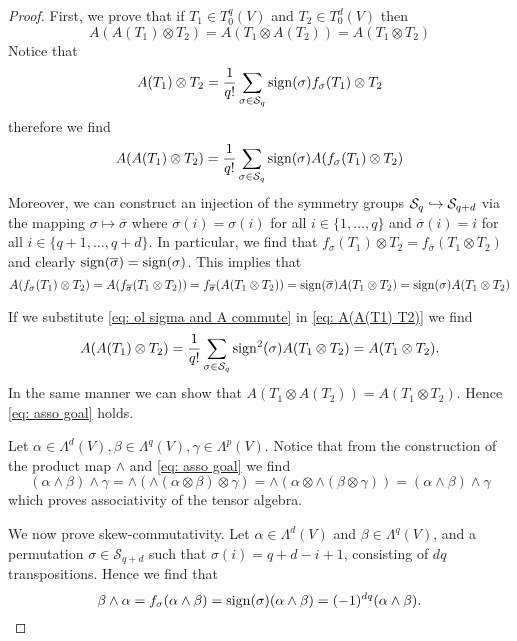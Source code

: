 \begin{proof}
  First, we prove that if \(T_1 \in T_0^q(V)\) and \(T_2 \in T_0^d(V)\) then
  \begin{equation}\label{eq: asso goal}
    A(A(T_1) \otimes T_2) = A(T_1 \otimes A(T_2)) =
    A(T_1 \otimes T_2)
  \end{equation} Notice that \[
    A(T_1) \otimes T_2 = \frac 1 {q!} \sum_{\sigma \in \mathcal S_q}
    \operatorname{sign}(\sigma) f_\sigma(T_1) \otimes T_2
  \] 
  therefore we find
  \begin{equation}\label{eq: A(A(T1) T2)}
    A(A(T_1) \otimes T_2) = \frac 1 {q!} \sum_{\sigma \in \mathcal S_q}
    \operatorname{sign}(\sigma) A(f_\sigma(T_1) \otimes T_2)
  \end{equation}
  Moreover, we can construct an injection of the symmetry groups \(\mathcal S_q
  \hookrightarrow \mathcal S_{q + d}\) via the mapping \(\sigma \mapsto \overline \sigma\)
  where \(\overline \sigma(i) = \sigma(i)\) for all \(i \in \{1, \dots, q\}\)
  and \(\overline \sigma(i) = i\) for all \(i \in \{q + 1, \dots, q + d\}\). In
  particular, we find that \(f_\sigma(T_1) \otimes T_2 = f_{\overline \sigma}
  (T_1 \otimes T_2)\) and clearly \(\operatorname{sign}(\overline \sigma) = \operatorname{sign}(\sigma)\).
  This implies that 
  \begin{equation}\label{eq: ol sigma and A commute}
    A(f_\sigma(T_1) \otimes T_2) = A(f_{\overline \sigma}(T_1 \otimes T_2))
    = f_{\overline \sigma}(A(T_1 \otimes T_2)) 
    = \operatorname{sign}(\overline \sigma) A(T_1 \otimes T_2)
    = \operatorname{sign}(\sigma) A(T_1 \otimes T_2)
  \end{equation}

  If we substitute \cref{eq: ol sigma and A commute} in \cref{eq: A(A(T1) T2)}
  we find
  \[
    A(A(T_1) \otimes T_2) = \frac 1 {q!} \sum_{\sigma \in \mathcal S_q}
    \operatorname{sign}^2(\sigma) A(T_1 \otimes T_2) = A(T_1 \otimes T_2).
  \] 
  In the same manner we can show that \(A(T_1 \otimes A(T_2)) = A(T_1 \otimes
  T_2)\). Hence \cref{eq: asso goal} holds.

  Let \(\alpha \in \Lambda^d(V), \beta \in \Lambda^q(V), \gamma \in \Lambda^p(V)\).
  Notice that from the construction of the product map \(\wedge\) and \cref{eq:
  asso goal} we find
  \[
    (\alpha \wedge \beta) \wedge \gamma 
    = \wedge\left( \wedge(\alpha \otimes \beta) \otimes \gamma \right) 
    = \wedge\left(\alpha \otimes \wedge(\beta \otimes \gamma) \right)
    = (\alpha \wedge \beta) \wedge \gamma
  \] 
  which proves associativity of the tensor algebra.

  We now prove skew-commutativity. Let \(\alpha \in \Lambda^d(V)\) and \(\beta
  \in \Lambda^q(V)\), and a permutation \(\sigma \in \mathcal S_{q + d}\) such
  that \(\sigma(i) = q + d - i + 1\), consisting of \(d q\) transpositions. 
  Hence we find that 
  \[
    \beta \wedge \alpha = f_\sigma(\alpha \wedge \beta)
    = \operatorname{sign}(\sigma)(\alpha \wedge \beta) = (-1)^{d q} (\alpha \wedge \beta).
  \]
\end{proof}

